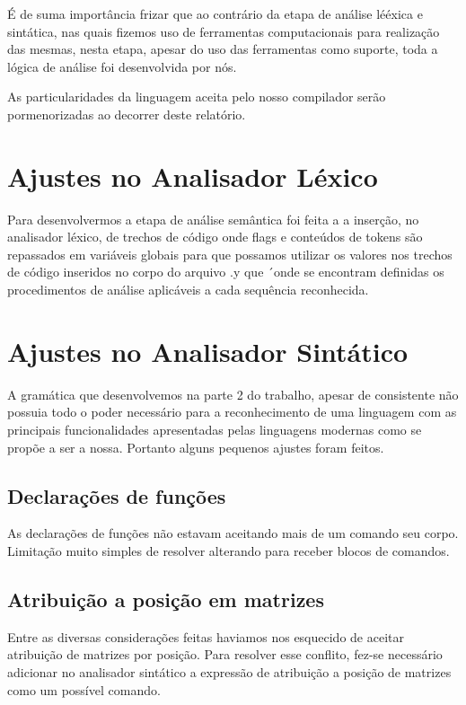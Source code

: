 \documentclass[a4paper,12pt]{report}
\begin{document}
\'E de suma import\^ancia frizar que ao contr\'ario da etapa de an\'alise lé\'exica e 
sint\'atica, nas quais fizemos uso de ferramentas computacionais para realiza\c{c}\~ao das 
mesmas, nesta etapa, apesar do uso das ferramentas como suporte, toda a l\'ogica de análise
foi desenvolvida por n\'os.

As particularidades da linguagem aceita pelo nosso compilador ser\~ao pormenorizadas ao 
decorrer deste relat\'orio.

\section{Ajustes no Analisador L\'exico}
  
Para desenvolvermos a etapa de an\'alise sem\^antica foi feita a a inser\c{c}\~ao, 
no analisador l\'exico, de trechos de c\'odigo onde flags e conte\'udos de tokens s\~ao 
repassados em vari\'aveis globais para que possamos utilizar os valores nos trechos de 
c\'odigo inseridos no corpo do arquivo .y que ´onde se encontram definidas os procedimentos 
de an\'alise aplic\'aveis a cada sequ\^encia reconhecida.

\section{Ajustes no Analisador Sint\'atico}

A gram\'atica que desenvolvemos na parte 2 do trabalho, apesar de consistente n\~ao possuia
todo o poder necess\'ario para a reconhecimento de uma linguagem com as principais
funcionalidades apresentadas pelas linguagens modernas como se prop\~oe a ser a nossa. Portanto
alguns pequenos ajustes foram feitos.

\subsection{Declara\c{c}\~oes de fun\c{c}\~oes}

As declara\c{c}\~oes de fun\c{c}\~oes n\~ao estavam aceitando mais de um comando 
seu corpo. Limita\c{c}\~ao muito simples de resolver alterando para receber blocos de comandos.

\subsection{Atribui\c{c}\~ao a posi\c{c}\~ao em matrizes}

Entre as diversas considera\c{c}\~oes feitas haviamos nos esquecido de aceitar atribui\c{c}\~ao
de matrizes por posi\c{c}\~ao. Para resolver esse conflito, fez-se necess\'ario adicionar no 
analisador sint\'atico a express\~ao de atribui\c{c}\~ao a posi\c{c}\~ao de matrizes como um 
poss\'ivel comando.
\end{document}
